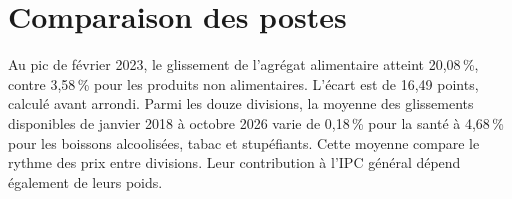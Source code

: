 \section{Comparaison des postes}
Au pic de février 2023, le glissement de l'agrégat alimentaire atteint 20,08\,\%, contre 3,58\,\% pour les produits non alimentaires. L'écart est de 16,49 points, calculé avant arrondi. Parmi les douze divisions, la moyenne des glissements disponibles de janvier 2018 à octobre 2026 varie de 0,18\,\% pour la santé à 4,68\,\% pour les boissons alcoolisées, tabac et stupéfiants. Cette moyenne compare le rythme des prix entre divisions. Leur contribution à l'IPC général dépend également de leurs poids.
\clearpage
